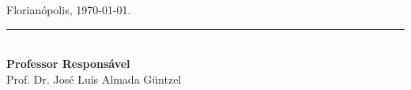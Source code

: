 \vspace{40pt}

\begin{flushright}

	Florianópolis, \today.

\end{flushright}

\vspace{20pt}


\begin{center}
	\parbox{7cm}{
		\centering
		\rule{6cm}{1pt}\\
		\small \textbf{Professor Responsável}\\
		Prof. Dr. José Luís Almada G{\"u}ntzel
	}
	\hfill
\end{center}



